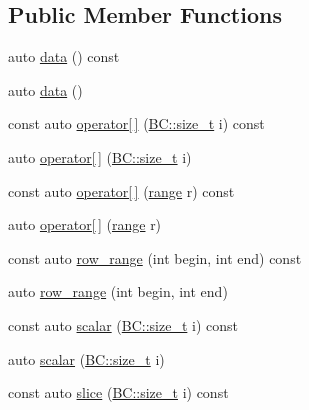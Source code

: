 \subsection*{Public Member Functions}
\begin{DoxyCompactItemize}
\item 
auto \hyperlink{classBC_1_1tensors_1_1Tensor__Accessor_af45b279a306290d7de50675ae9ffa311}{data} () const 
\item 
auto \hyperlink{classBC_1_1tensors_1_1Tensor__Accessor_af0ed27564b32dd2473ac2b8a55d8c080}{data} ()
\item 
const auto \hyperlink{classBC_1_1tensors_1_1Tensor__Accessor_a001d37f2fabdc5ef18edfe9bd10fe5e3}{operator\mbox{[}$\,$\mbox{]}} (\hyperlink{namespaceBC_a6007cbc4eeec401a037b558910a56173}{B\+C\+::size\+\_\+t} i) const 
\item 
auto \hyperlink{classBC_1_1tensors_1_1Tensor__Accessor_aa39670601f51c3092c6b3988844e0659}{operator\mbox{[}$\,$\mbox{]}} (\hyperlink{namespaceBC_a6007cbc4eeec401a037b558910a56173}{B\+C\+::size\+\_\+t} i)
\item 
const auto \hyperlink{classBC_1_1tensors_1_1Tensor__Accessor_a79ae050b43569bfb4819d873af509a8b}{operator\mbox{[}$\,$\mbox{]}} (\hyperlink{structBC_1_1tensors_1_1Tensor__Accessor_1_1range}{range} r) const 
\item 
auto \hyperlink{classBC_1_1tensors_1_1Tensor__Accessor_a3d561d7994b9db3edb9627a1fefc3735}{operator\mbox{[}$\,$\mbox{]}} (\hyperlink{structBC_1_1tensors_1_1Tensor__Accessor_1_1range}{range} r)
\item 
const auto \hyperlink{classBC_1_1tensors_1_1Tensor__Accessor_aa069bf7697c413b55ea09d63a065bfce}{row\+\_\+range} (int begin, int end) const 
\item 
auto \hyperlink{classBC_1_1tensors_1_1Tensor__Accessor_a1805ce1692b8f56cd76e0939472d97e7}{row\+\_\+range} (int begin, int end)
\item 
const auto \hyperlink{classBC_1_1tensors_1_1Tensor__Accessor_a46207f37d7b9657fd753bf1d19aa8f4b}{scalar} (\hyperlink{namespaceBC_a6007cbc4eeec401a037b558910a56173}{B\+C\+::size\+\_\+t} i) const 
\item 
auto \hyperlink{classBC_1_1tensors_1_1Tensor__Accessor_a53ff822d6df9a09780e660b1111326da}{scalar} (\hyperlink{namespaceBC_a6007cbc4eeec401a037b558910a56173}{B\+C\+::size\+\_\+t} i)
\item 
const auto \hyperlink{classBC_1_1tensors_1_1Tensor__Accessor_a6e673c6ea69f19de903d2043cd4858ae}{slice} (\hyperlink{namespaceBC_a6007cbc4eeec401a037b558910a56173}{B\+C\+::size\+\_\+t} i) const 

\end{DoxyCompactItemize}
